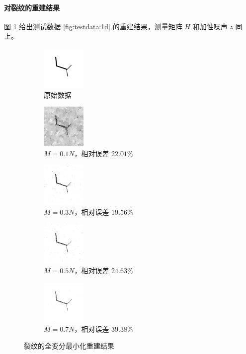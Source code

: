 \paragraph{对裂纹的重建结果} 图 \ref{fig:TV1d} 给出测试数据
\ref{fig:testdata:1d} 的重建结果，测量矩阵 $H$ 和加性噪声 $z$
同上。

\begin{figure}
\centering
\begin{subfigure}[t]{1in}
	\includegraphics{Figure/testdata/1d.png}
	\caption{原始数据}
\end{subfigure}
\begin{subfigure}[t]{1in}
	\includegraphics{Figure/TV/1d10.png}
	\caption{$M = 0.1 N$，相对误差 $22.01\%$}
\end{subfigure}
\begin{subfigure}[t]{1in}
	\includegraphics{Figure/TV/1d30.png}
	\caption{$M = 0.3 N$，相对误差 $19.56\%$}
\end{subfigure}
\begin{subfigure}[t]{1in}
	\includegraphics{Figure/TV/1d50.png}
	\caption{$M = 0.5 N$，相对误差 $24.63\%$}
\end{subfigure}
\begin{subfigure}[t]{1in}
	\includegraphics{Figure/TV/1d70.png}
	\caption{$M = 0.7 N$，相对误差 $39.38\%$}
\end{subfigure}
\caption{裂纹的全变分最小化重建结果}
\label{fig:TV1d}
\end{figure}

